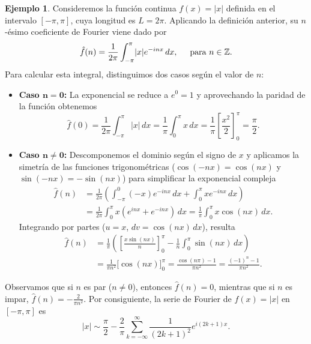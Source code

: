 \documentclass[12pt]{article}
\theoremstyle{plain}
\theoremstyle{definition}
\newtheorem{ejemplo}[teorema]{Ejemplo}
\numberwithin{equation}{section}
\begin{document}
        \begin{ejemplo}
            Consideremos la función continua \(f(x) = \lvert x \rvert\) definida en el intervalo \([-\pi,\pi]\), cuya longitud es \(L = 2\pi\). Aplicando la definición anterior, su \(n\)-ésimo coeficiente de Fourier viene dado por
            \begin{equation*}
                \hat{f}(n) = \frac{1}{2\pi} \int_{-\pi}^{\pi} \lvert x \rvert e^{-inx} \,dx, \hspace{5mm} \text{para \(n \in \mathbb{Z}\)}.
            \end{equation*}
            Para calcular esta integral, distinguimos dos casos según el valor de \(n\):
            \begin{itemize}
                \item \textbf{Caso \(\boldsymbol{n = 0}\):} La exponencial se reduce a \(e^0 = 1\) y aprovechando la paridad de la función obtenemos
                \begin{equation*}
                    \hat{f}(0) = \frac{1}{2\pi} \int_{-\pi}^{\pi} \lvert x \rvert \,dx = \frac{1}{\pi} \int_{0}^{\pi} x \,dx = \frac{1}{\pi} \left[ \frac{x^2}{2} \right]_0^{\pi} = \frac{\pi}{2}.
                \end{equation*}
                \item \textbf{Caso \(\boldsymbol{n \neq 0}\):} Descomponemos el dominio según el signo de \(x\) y aplicamos la simetría de las funciones trigonométricas (\(\cos(-nx) = \cos(nx)\) y \(\sin(-nx) = -\sin(nx)\)) para simplificar la exponencial compleja
                \begin{align*}
                    \hat{f}(n) &= \frac{1}{2\pi} \left( \int_{-\pi}^{0} (-x) e^{-inx} \,dx + \int_{0}^{\pi} x e^{-inx} \,dx \right) \\
                    &= \frac{1}{2\pi} \int_{0}^{\pi} x \left( e^{inx} + e^{-inx} \right) \,dx = \frac{1}{\pi} \int_{0}^{\pi} x \cos(nx) \,dx.
                \end{align*}
                Integrando por partes (\(u = x\), \(dv = \cos(nx)\,dx\)), resulta
                \begin{align*}
                    \hat{f}(n) &= \frac{1}{\pi} \left( \left[ \frac{x \sin(nx)}{n} \right]_0^{\pi} - \frac{1}{n} \int_{0}^{\pi} \sin(nx) \,dx \right) \\
                    &= \frac{1}{\pi n^2} \Big[ \cos(nx) \Big]_0^{\pi} = \frac{\cos(n\pi) - 1}{\pi n^2} = \frac{(-1)^n - 1}{\pi n^2}.
                \end{align*}
            \end{itemize}
            Observamos que si \(n\) es par (\(n \neq 0\)), entonces \(\hat{f}(n) = 0\), mientras que si \(n\) es impar, \(\hat{f}(n) = -\frac{2}{\pi n^2}\). Por consiguiente, la serie de Fourier de \(f(x) = \lvert x \rvert\) en \([-\pi,\pi]\) es
            \begin{equation*}
                \lvert x \rvert \sim \frac{\pi}{2} - \frac{2}{\pi} \sum_{k = -\infty}^{\infty} \frac{1}{(2k+1)^2} e^{i(2k+1)x}.
            \end{equation*}
        \end{ejemplo}
\end{document}

